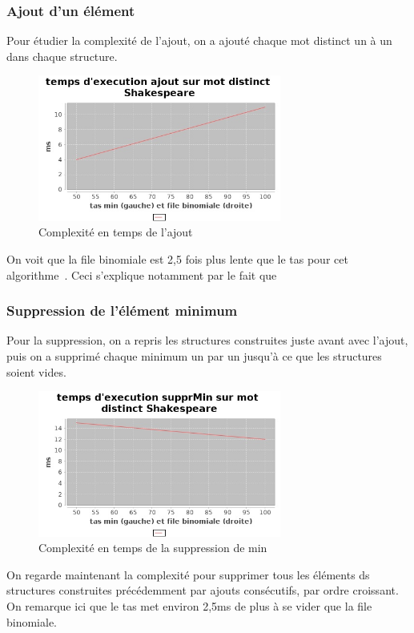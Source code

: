 \documentclass{article}
\begin{document}
\subsubsection{Ajout d'un élément}

Pour étudier la complexité de l'ajout, on a ajouté chaque mot distinct un à un dans chaque structure.

\begin{figure}[h!]
\centering
\includegraphics[width=8cm]{ajout_SP_tas_array.jpg}
\caption{Complexité en temps de l'ajout}
\label{fig:fbtasajout}
\end{figure}

On voit que la file binomiale est 2,5 fois plus lente que le tas pour cet algorithme . Ceci s’explique notamment par le fait que %

\subsubsection{Suppression de l'élément minimum}

Pour la suppression, on a repris les structures construites juste avant avec l'ajout, puis on a supprimé chaque minimum un par un jusqu'à ce que les structures soient vides.

\begin{figure}[h!]
\centering
\includegraphics[width=8cm]{supprmin_SP_tas_array.jpg}
\caption{Complexité en temps de la suppression de min}
\label{fig:fbtassuppr}
\end{figure}

On regarde maintenant la complexité pour supprimer tous les éléments ds structures construites précédemment par ajouts consécutifs, par ordre croissant. On remarque ici que le tas met environ 2,5ms de plus à se vider que la file binomiale. %
\end{document}
